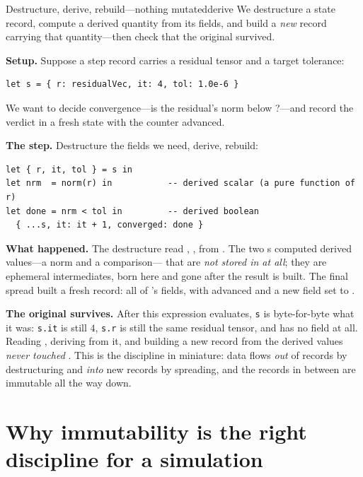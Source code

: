 \begin{workedexample}{Destructure, derive, rebuild---nothing mutated}{derive}
We destructure a state record, compute a derived quantity from its fields, and
build a \emph{new} record carrying that quantity---then check that the original
survived.

\textbf{Setup.} Suppose a step record carries a residual tensor and a target
tolerance:
\begin{lstlisting}[style=l4style]
let s = { r: residualVec, it: 4, tol: 1.0e-6 }
\end{lstlisting}
We want to decide convergence---is the residual's norm below ?---and
record the verdict in a fresh state with the counter advanced.

\textbf{The step.} Destructure the fields we need, derive, rebuild:
\begin{lstlisting}[style=l4style]
let { r, it, tol } = s in
let nrm  = norm(r) in           -- derived scalar (a pure function of r)
let done = nrm < tol in         -- derived boolean
  { ...s, it: it + 1, converged: done }
\end{lstlisting}

\tcblower
\textbf{What happened.} The destructure read , ,  from
. The two s computed derived values---a norm and a comparison---
that are \emph{not stored in  at all}; they are ephemeral intermediates,
born here and gone after the result is built. The final spread built a fresh
record: all of 's fields, with  advanced and a new
 field set to .

\textbf{The original survives.} After this expression evaluates,
\lstinline[style=l4style]|s| is byte-for-byte what it was:
\lstinline[style=l4style]|s.it| is still $4$, \lstinline[style=l4style]|s.r| is
still the same residual tensor, and  has no  field at all.
Reading , deriving from it, and building a new record from the derived
values \emph{never touched }. This is the discipline in miniature: data
flows \emph{out} of records by destructuring and \emph{into} new records by
spreading, and the records in between are immutable all the way down.
\end{workedexample}

\section{Why immutability is the right discipline for a simulation}

